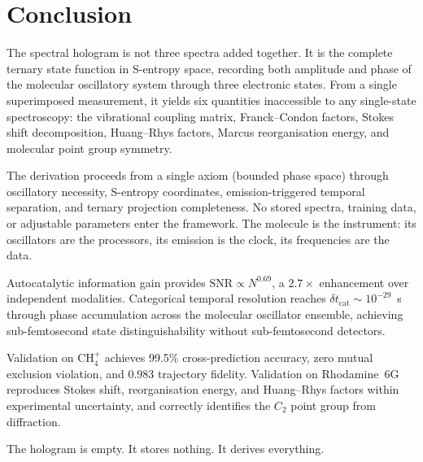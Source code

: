 \documentclass[11pt,a4paper]{article}
\theoremstyle{definition}
\theoremstyle{remark}
\begin{document}
\section{Conclusion}
\label{sec:conclusion}

The spectral hologram is not three spectra added together. It is the complete ternary state function in S-entropy space, recording both amplitude and phase of the molecular oscillatory system through three electronic states. From a single superimposed measurement, it yields six quantities inaccessible to any single-state spectroscopy: the vibrational coupling matrix, Franck--Condon factors, Stokes shift decomposition, Huang--Rhys factors, Marcus reorganisation energy, and molecular point group symmetry.

The derivation proceeds from a single axiom (bounded phase space) through oscillatory necessity, S-entropy coordinates, emission-triggered temporal separation, and ternary projection completeness. No stored spectra, training data, or adjustable parameters enter the framework. The molecule is the instrument: its oscillators are the processors, its emission is the clock, its frequencies are the data.

Autocatalytic information gain provides $\mathrm{SNR} \propto N^{0.69}$, a $2.7\times$ enhancement over independent modalities. Categorical temporal resolution reaches $\delta t_{\mathrm{cat}} \sim 10^{-29}$~s through phase accumulation across the molecular oscillator ensemble, achieving sub-femtosecond state distinguishability without sub-femtosecond detectors.

Validation on CH$_4^+$ achieves 99.5\% cross-prediction accuracy, zero mutual exclusion violation, and 0.983 trajectory fidelity. Validation on Rhodamine~6G reproduces Stokes shift, reorganisation energy, and Huang--Rhys factors within experimental uncertainty, and correctly identifies the $C_2$ point group from diffraction.

The hologram is empty. It stores nothing. It derives everything.

\bigskip


\end{document}
